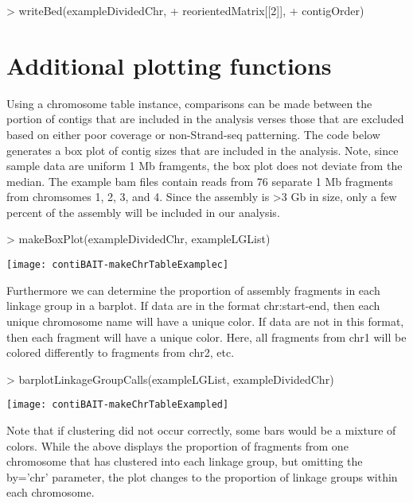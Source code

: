 \documentclass{article}
\begin{document}
\begin{Schunk}
\begin{Sinput}
> writeBed(exampleDividedChr,
+ reorientedMatrix[[2]],
+ contigOrder)
\end{Sinput}
\end{Schunk}

\newpage
\section{Additional plotting functions}

Using a chromosome table instance, comparisons can be made between the portion of contigs that are included in the analysis verses those that are excluded based on either poor coverage or non-Strand-seq patterning. The code below generates a box plot of contig sizes that are included in the analysis. Note, since sample data are uniform 1 Mb framgents, the box plot does not deviate from the median.  The example bam files contain reads from 76 separate 1 Mb fragments from chromsomes 1, 2, 3, and 4.  Since the assembly is >3 Gb in size, only a few percent of the assembly will be included in our analysis.

\begin{Schunk}
\begin{Sinput}
> makeBoxPlot(exampleDividedChr, exampleLGList)
\end{Sinput}
\end{Schunk}
\texttt{[image: contiBAIT-makeChrTableExamplec]}

\newpage
Furthermore we can determine the proportion of assembly fragments in each linkage group in a barplot. If data are in the format chr:start-end, then each unique chromosome name will have a unique color. If data are not in this format, then each fragment will have a unique color.  Here, all fragments from chr1 will be colored differently to fragments from chr2, etc.

\begin{Schunk}
\begin{Sinput}
> barplotLinkageGroupCalls(exampleLGList, exampleDividedChr)
\end{Sinput}
\end{Schunk}
\texttt{[image: contiBAIT-makeChrTableExampled]}

Note that if clustering did not occur correctly, some bars would be a mixture of colors.  While the above displays the proportion of fragments from one chromosome that has clustered into each linkage group, but omitting the by='chr' parameter, the plot changes to the proportion of linkage groups within each chromosome.
\end{document}
